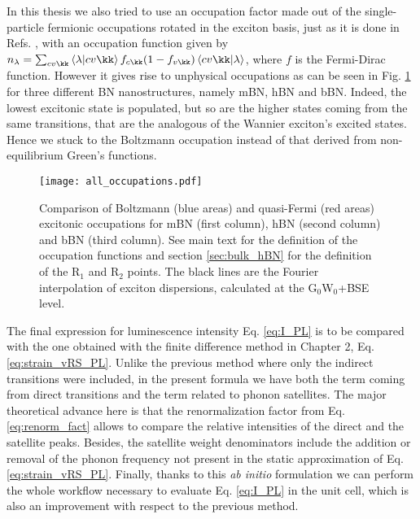 In this thesis we also tried to use an occupation factor made out of the single-particle fermionic occupations rotated in the exciton basis, just as it is done in Refs. \cite{cannuccia2019theory,de2016unified,libbi2022phonon}, with an occupation function given by $n_{\lambda} = \sum_{cv\kk} \bra{\lambda}\ket{cv\kk} f_{c\kk} (1-f_{v\kk}) \bra{cv\kk}\ket{\lambda}$, where $f$ is the Fermi-Dirac function. However it gives rise to unphysical occupations as can be seen in Fig. \ref{fig:all_occup} for three different BN nanostructures, namely \acrshort{mBN}, \acrshort{hBN} and \acrshort{bBN}. Indeed, the lowest excitonic state is populated, but so are the higher states coming from the same transitions, that are the analogous of the Wannier exciton's excited states. Hence we stuck to the Boltzmann occupation instead of that derived from non-equilibrium Green's functions.
\begin{figure}[h!b]
	\vspace{0.2cm}
	\setcapindent{2em}
	\centering
	\texttt{[image: all\_occupations.pdf]}
	\caption{Comparison of Boltzmann (blue areas) and quasi-Fermi (red areas) excitonic occupations for \acrshort{mBN} (first column), \acrshort{hBN} (second column) and bBN (third column). See main text for the definition of the occupation functions and section \ref{sec:bulk_hBN} for the definition of the R$_1$ and R$_2$ points. The black lines are the Fourier interpolation of exciton dispersions, calculated at the G$_0$W$_0$+BSE level.}
	\label{fig:all_occup}
\end{figure}

The final expression for luminescence intensity Eq. \eqref{eq:I_PL} is to be compared with the one obtained with the finite difference method in Chapter 2, Eq. \eqref{eq:strain_vRS_PL}. Unlike the previous method where only the indirect transitions were included, in the present formula we have both the term coming from direct transitions and the term related to phonon satellites. The major theoretical advance here is that the renormalization factor from Eq. \eqref{eq:renorm_fact} allows to compare the relative intensities of the direct and the satellite peaks. Besides, the satellite weight denominators include the addition or removal of the phonon frequency not present in the static approximation of Eq. \eqref{eq:strain_vRS_PL}. Finally, thanks to this \textit{ab initio} formulation we can perform the whole workflow necessary to evaluate Eq. \eqref{eq:I_PL} in the unit cell, which is also an improvement with respect to the previous method. 


